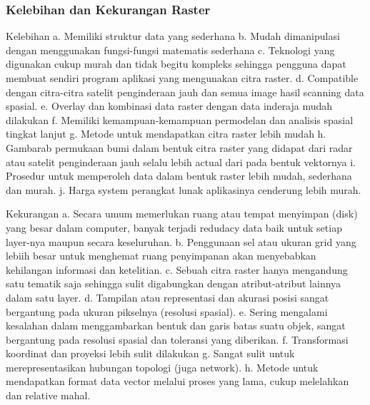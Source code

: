 \subsubsection{Kelebihan dan Kekurangan Raster}
 Kelebihan
 a. Memiliki struktur data yang sederhana
 b. Mudah dimanipulasi dengan menggunakan fungsi-fungsi matematis sederhana
 c. Teknologi yang digunakan cukup murah dan tidak begitu kompleks sehingga pengguna dapat 
    membuat sendiri program aplikasi yang mengunakan citra raster.
 d. Compatible dengan citra-citra satelit penginderaan jauh dan semua image hasil scanning data spasial.
 e. Overlay dan kombinasi data raster dengan data inderaja mudah dilakukan
 f. Memiliki kemampuan-kemampuan permodelan dan analisis spasial tingkat lanjut
 g. Metode untuk mendapatkan citra raster lebih mudah
 h. Gambarab permukaan bumi dalam bentuk citra raster yang didapat dari radar atau satelit penginderaan jauh selalu lebih actual dari       pada bentuk vektornya
 i. Prosedur untuk memperoleh data dalam bentuk raster lebih mudah, sederhana dan murah.
 j. Harga system perangkat lunak aplikasinya cenderung lebih murah.
 
 Kekurangan
 a. Secara umum memerlukan ruang atau tempat menyimpan (disk) yang besar dalam computer, 
    banyak terjadi redudacy data baik untuk setiap layer-nya maupun secara keseluruhan.
 b. Penggunaan sel atau ukuran grid yang lebiih besar untuk menghemat ruang penyimpanan akan 
    menyebabkan kehilangan informasi dan ketelitian.
 c. Sebuah citra raster hanya mengandung satu tematik saja sehingga sulit digabungkan 
    dengan atribut-atribut lainnya dalam satu layer.
 d. Tampilan atau representasi dan akurasi posisi sangat bergantung pada ukuran pikselnya (resolusi spasial).
 e. Sering mengalami kesalahan dalam menggambarkan bentuk dan garis batas suatu objek, 
    sangat bergantung pada resolusi spasial dan toleransi yang diberikan.
 f. Transformasi koordinat dan proyeksi lebih sulit dilakukan
 g. Sangat sulit untuk merepresentasikan hubungan topologi (juga network).
 h. Metode untuk mendapatkan format data vector melalui proses yang lama, cukup melelahkan dan relative mahal.
 
 
